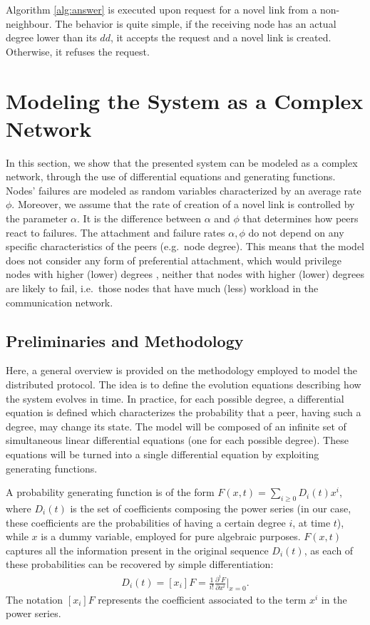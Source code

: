 \documentclass[a4paper,twosided]{article}
\begin{document}
Algorithm \ref{alg:answer} is executed upon request for a novel link from a non-neighbour. The behavior is quite simple, if the receiving node has an actual degree lower than its $dd$, it accepts the request and a novel link is created. Otherwise, it refuses the request.


\section{Modeling the System as a Complex Network}
\label{sec:model}


In this section, we show that the presented system can be modeled as a complex network, through the use of differential equations and generating functions. 
Nodes' failures are modeled as random variables characterized by an average rate $\phi$. Moreover, we assume that
the rate of creation of a novel link is controlled by the parameter $\alpha$. It is the difference between $\alpha$ and $\phi$ that determines how peers react to failures. The attachment and failure rates $\alpha, \phi$ do not depend on any specific characteristics of the peers (e.g.~node degree). 
This means that the model does not consider any form of preferential attachment, which would privilege nodes with higher (lower) degrees \cite{Newman03thestructure}, neither that nodes with higher (lower) degrees are likely to fail, i.e.~those nodes that have much (less) workload in the communication network. 




\subsection{Preliminaries and Methodology}

Here, a general overview is provided on the methodology employed to model the distributed protocol. 
The idea is to define the evolution equations describing how the system evolves in time. In practice, for each possible degree, a differential equation is defined which characterizes the probability that a peer, having such a degree, may change its state.
The model will be composed of an infinite set of simultaneous linear differential equations (one for each possible degree). These equations will be turned into a single differential equation by exploiting generating functions.

A probability generating function is of the form $F(x,t) = \sum_{i\geq 0} D_i(t) x^i$, where $D_i(t)$ is the set of coefficients composing the power series (in our case, these coefficients are the probabilities of having a certain degree $i$, at time $t$), while $x$ is a dummy variable, employed for pure algebraic purposes. 
$F(x,t)$ captures all the information present in the original sequence $D_i(t)$, as each of these probabilities can be recovered by simple differentiation:
\begin{eqnarray}
D_i(t) = [x_i]F =  \frac{1}{i!}\frac{\partial^i F}{\partial x^i}\Big\rvert_{x=0}.\nonumber
\end{eqnarray}
The notation $[x_i]F$ represents the coefficient associated to the term $x^i$ in the power series.
\end{document}
